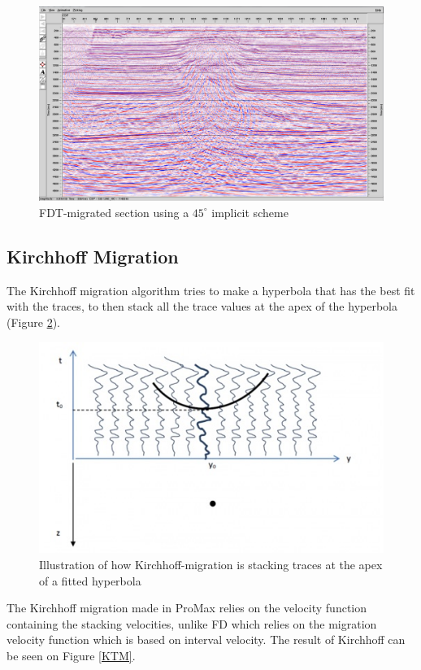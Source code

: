 \documentclass[10pt,a4paper]{article}
\begin{document}
\begin{figure}[H]
\includegraphics[width=\textwidth]{FDmed3aforkirchh.jpg}
\caption{FDT-migrated section using a $45^{\circ}$ implicit scheme}
\label{FDTM}
\end{figure}

\subsection{Kirchhoff Migration}

The Kirchhoff migration algorithm tries to make a hyperbola that has the best fit with the traces, to then stack all the trace values at the apex of the hyperbola (Figure \ref{KGeoClass}). 

\begin{figure}[H]
\includegraphics[scale=0.5]{kirchhoffGeoClass.jpg}
\caption{Illustration of how Kirchhoff-migration is stacking traces at the apex of a fitted hyperbola}
\label{KGeoClass}
\end{figure}

\noindent The Kirchhoff migration made in ProMax relies on the velocity function containing the stacking velocities, unlike FD which relies on the migration velocity function which is based on interval velocity. The result of Kirchhoff can be seen on Figure \ref{KTM}.
\end{document}
